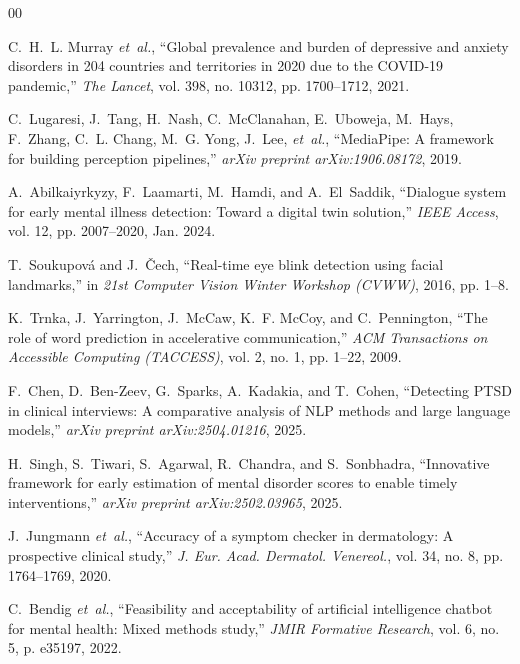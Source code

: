 \documentclass[conference]{IEEEtran}
\begin{document}
\begin{thebibliography}{00}

C.~H.~L. Murray \emph{et~al.}, ``Global prevalence and burden of depressive and anxiety disorders in 204 countries and territories in 2020 due to the COVID-19 pandemic,'' \emph{The Lancet}, vol. 398, no. 10312, pp. 1700--1712, 2021.

C.~Lugaresi, J.~Tang, H.~Nash, C.~McClanahan, E.~Uboweja, M.~Hays, F.~Zhang, C.~L. Chang, M.~G. Yong, J.~Lee, \emph{et~al.}, ``MediaPipe: A framework for building perception pipelines,'' \emph{arXiv preprint arXiv:1906.08172}, 2019.

A.~Abilkaiyrkyzy, F.~Laamarti, M.~Hamdi, and A.~El~Saddik, ``Dialogue system for early mental illness detection: Toward a digital twin solution,'' \emph{IEEE Access}, vol. 12, pp. 2007--2020, Jan. 2024.

T.~Soukupov{\'a} and J.~{\v{C}}ech, ``Real-time eye blink detection using facial landmarks,'' in \emph{21st Computer Vision Winter Workshop (CVWW)}, 2016, pp. 1--8.

K.~Trnka, J.~Yarrington, J.~McCaw, K.~F. McCoy, and C.~Pennington, ``The role of word prediction in accelerative communication,'' \emph{ACM Transactions on Accessible Computing (TACCESS)}, vol. 2, no. 1, pp. 1--22, 2009.

F.~Chen, D.~Ben-Zeev, G.~Sparks, A.~Kadakia, and T.~Cohen, ``Detecting PTSD in clinical interviews: A comparative analysis of NLP methods and large language models,'' \emph{arXiv preprint arXiv:2504.01216}, 2025.

H.~Singh, S.~Tiwari, S.~Agarwal, R.~Chandra, and S.~Sonbhadra, ``Innovative framework for early estimation of mental disorder scores to enable timely interventions,'' \emph{arXiv preprint arXiv:2502.03965}, 2025.

J.~Jungmann \emph{et~al.}, ``Accuracy of a symptom checker in dermatology: A prospective clinical study,'' \emph{J. Eur. Acad. Dermatol. Venereol.}, vol. 34, no. 8, pp. 1764--1769, 2020.

C.~Bendig \emph{et~al.}, ``Feasibility and acceptability of artificial intelligence chatbot for mental health: Mixed methods study,'' \emph{JMIR Formative Research}, vol. 6, no. 5, p. e35197, 2022.


\end{thebibliography}
\end{document}
